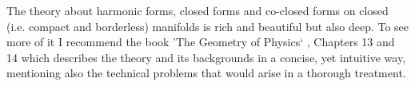 The theory about harmonic forms, closed forms and co-closed forms on closed (i.e. compact and borderless) manifolds is rich and beautiful but also deep. To see more of it I recommend the book 'The Geometry of Physics` \cite{FRANKEL11}, Chapters 13 and 14 which describes the theory and its backgrounds in a concise, yet intuitive way, mentioning also the technical problems that would arise in a thorough treatment.

%
%
%
%
